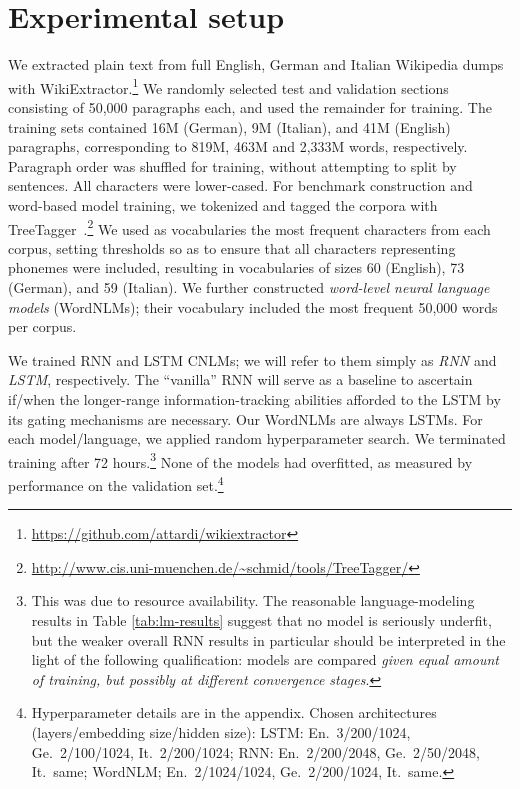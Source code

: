 \section{Experimental setup}
\label{sec:setup}

We extracted plain text from full English, German and Italian
Wikipedia dumps with
WikiExtractor.\footnote{\url{https://github.com/attardi/wikiextractor}}
We randomly selected test and validation sections consisting of 50,000
paragraphs each, and used the remainder for training. The training
sets contained 16M (German), 9M (Italian), and 41M (English)
paragraphs, corresponding to 819M, 463M and 2,333M words,
respectively. Paragraph order was shuffled for training, without
attempting to split by sentences. All characters were lower-cased.
For benchmark construction and word-based model training, we tokenized
and tagged the corpora with
TreeTagger~\citep{schmid1999improvements}.\footnote{\url{http://www.cis.uni-muenchen.de/~schmid/tools/TreeTagger/}}
We used as vocabularies the most frequent characters from each corpus,
setting thresholds so as to ensure that all characters representing
phonemes were included, resulting in vocabularies of sizes 60
(English), 73 (German), and 59 (Italian).  We further constructed
\emph{word-level neural language models} (WordNLMs); their vocabulary
included the most frequent 50,000 words per corpus.

We trained RNN and LSTM CNLMs; we will refer to them simply as
\emph{RNN} and \emph{LSTM}, respectively. The ``vanilla'' RNN will
serve as a baseline to ascertain if/when the longer-range
information-tracking abilities afforded to the LSTM by its gating
mechanisms are necessary. Our WordNLMs are always LSTMs.  For each
model/language, we applied random hyperparameter search.  We
terminated training after 72 hours.\footnote{This was due to resource
  availability. The reasonable language-modeling results in Table
  \ref{tab:lm-results} suggest that no model is seriously underfit,
  but the weaker overall RNN results in particular should be
  interpreted in the light of the following qualification: models are
  compared \emph{given equal amount of training, but possibly at
    different convergence stages}.} None of the models had overfitted,
as measured by performance on the validation
set.\footnote{Hyperparameter details are in the appendix. Chosen architectures
  (layers/embedding size/hidden size): LSTM: En.~3/200/1024,
  Ge.~2/100/1024, It.~2/200/1024; RNN: En.~2/200/2048, Ge.~2/50/2048,
  It.~same; WordNLM; En.~2/1024/1024, Ge.~2/200/1024, It.~same.}

